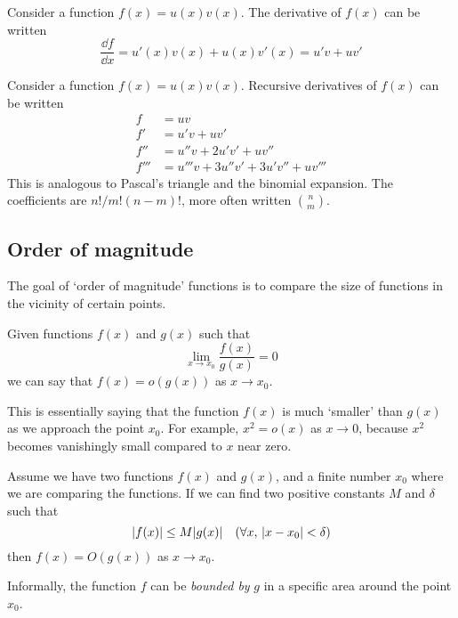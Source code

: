 \begin{definition}
	Consider a function \(f(x) = u(x)v(x)\).
	The derivative of \(f(x)\) can be written
	\begin{equation}
		\frac{\dd{f}}{\dd{x}} = u'(x)v(x) + u(x)v'(x) = u'v + uv'
	\end{equation}
\end{definition}

\begin{definition}
	Consider a function \(f(x) = u(x)v(x)\).
	Recursive derivatives of \(f(x)\) can be written
	\begin{align}
		f    & = uv                                        \\
		f'   & = u'v + uv' \nonumber                       \\
		f''  & = u''v + 2u'v' + uv'' \nonumber             \\
		f''' & = u'''v + 3u''v' + 3u'v'' + uv''' \nonumber
	\end{align}
	This is analogous to Pascal's triangle and the binomial expansion.
	The coefficients are \(n!/m!(n-m)!
	\), more often written \(n \choose m\).
\end{definition}

\subsection{Order of magnitude}
The goal of `order of magnitude' functions is to compare the size of functions in the vicinity of certain points.
\begin{definition}[Little \(o\)]
	Given functions \(f(x)\) and \(g(x)\) such that
	\begin{equation}
		\lim\limits_{x \to x_0} \frac{f(x)}{g(x)} = 0
	\end{equation}
	we can say that \(f(x) = o(g(x))\) as \(x \to x_0\).
\end{definition}

This is essentially saying that the function \(f(x)\) is much `smaller' than \(g(x)\) as we approach the point \(x_0\).
For example, \(x^2 = o(x)\) as \(x \to 0\), because \(x^2\) becomes vanishingly small compared to \(x\) near zero.

\begin{definition}
	Assume we have two functions \(f(x)\) and \(g(x)\), and a finite number \(x_0\) where we are comparing the functions.
	If we can find two positive constants \(M\) and \(\delta\) such that
	\begin{equation}
		\abs{f(x)} \leq M\abs{g(x)} \quad(\forall x,\, \abs{x-x_0} < \delta)
	\end{equation}
	then \(f(x) = O(g(x))\) as \(x \to x_0\).
\end{definition}
Informally, the function \(f\) can be \textit{bounded by} \(g\) in a specific area around the point \(x_0\).

